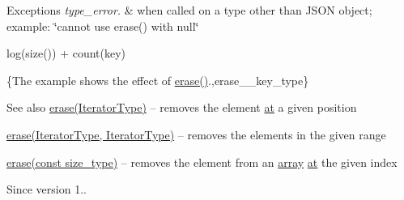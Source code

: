 \begin{DoxyExceptions}{Exceptions}
{\em type\+\_\+error.} & when called on a type other than J\+S\+ON object; example\+: {\ttfamily \char`\"{}cannot use erase() with null\char`\"{}}\\
\hline
\end{DoxyExceptions}
{\ttfamily log(size()) + count(key)}

\{The example shows the effect of {\ttfamily \hyperlink{classnlohmann_1_1basic__json_a494632b69bbe1d0153d3bedad0901b8e}{erase()}}.,erase\+\_\+\+\_\+key\+\_\+type\}

\begin{DoxySeeAlso}{See also}
\hyperlink{classnlohmann_1_1basic__json_a494632b69bbe1d0153d3bedad0901b8e}{erase(\+Iterator\+Type)} -- removes the element \hyperlink{classnlohmann_1_1basic__json_a52b18a5b7e68652c65b070900c438c6e}{at} a given position 

\hyperlink{classnlohmann_1_1basic__json_a8ac83750e267e37d5d47591eb44cce42}{erase(\+Iterator\+Type, Iterator\+Type)} -- removes the elements in the given range 

\hyperlink{classnlohmann_1_1basic__json_a221b943d3228488c14225e55f726cc26}{erase(const size\+\_\+type)} -- removes the element from an \hyperlink{classnlohmann_1_1basic__json_ad2b075c694e4564c9742d2c8db7c7c5f}{array} \hyperlink{classnlohmann_1_1basic__json_a52b18a5b7e68652c65b070900c438c6e}{at} the given index
\end{DoxySeeAlso}
\begin{DoxySince}{Since}
version 1.. 
\end{DoxySince}
